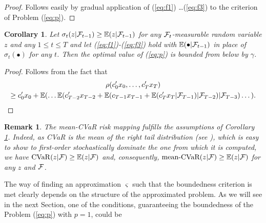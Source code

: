 \documentclass{article}              %
\newtheorem{remark}{Remark}
\newtheorem{corollary}{Corollary}
\begin{document}
\begin{proof} Follows easily by gradual application of (\ref{eq:f1}) \dots (\ref{eq:f3}) to the criterion of Problem (\ref{eq:p}).
\end{proof}

\begin{corollary}\label{cor:feas}
Let $\sigma_{t}(z|\mathcal{F}_{t-1})\geq \mathbb{E}(z|\mathcal{F}_{t-1})$ for any $\mathcal{F}_t$-measurable random variable $z$ and any $1\leq t\leq T$ and 
let (\ref{eq:f1})-(\ref{eq:f3}) hold with $\mathbb{E}(\bullet|\mathcal{F}_{t-1})$ in place of $\sigma_t(\bullet)$ for any $t$. Then the optimal value of (\ref{eq:p}) is bounded from below by $\gamma$.
\end{corollary}

\begin{proof}Follows from the fact that
\begin{multline*}
\rho(c'_{0}x_{0},\dots,c'_{T}x_{T})
\\ 
\geq c'_{0}x_{0}+\mathbb{E}(\dots\mathbb{E}(c'_{T-2}x_{T-2}+\mathbb{E}(c_{T-1}x_{T-1}+\mathbb{E}(c'_{T}x_{T}|\mathcal{F}_{T-1})|\mathcal{F}_{T-2})|\mathcal{F}_{T-3})\dots).
\end{multline*}

\end{proof}


\begin{remark} The mean-CVaR risk mapping fulfills the assumptions of Corollary \ref{cor:feas}. Indeed, as CVaR is the mean of the right tail distribution (see \cite{rockafellar2002conditional}), which is easy
to show to first-order stochastically dominate the one from which
it is computed, we have $\mathrm{CVaR}(z|\mathcal{F}) \geq \mathbb{E}(z|\mathcal{F})$ and, consequently,  $\text{mean-CVaR}(z|\mathcal{F})\geq\mathbb{E}(z|\mathcal{F})$ for any $z$ and $\mathcal{F}$.
\end{remark}

\noindent The way of finding an approximation $\varsigma$ such that the boundedness
criterion is met clearly depends on the structure of the approximated problem.
As we will see in the next Section, one of the conditions, guaranteeing
the boundedness of the Problem (\ref{eq:p}) with $p=1$, could be
\end{document}
